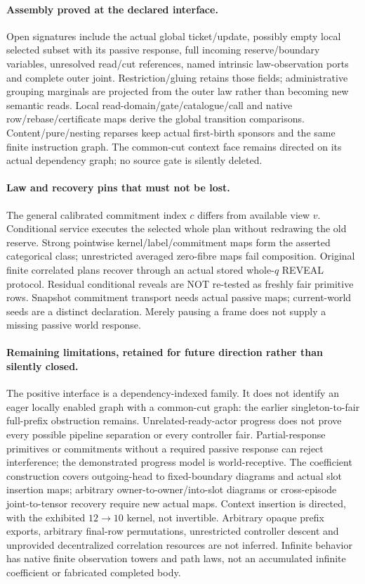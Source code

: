 \documentclass{article}\usepackage{amsmath,amssymb,url}
\begin{document}
\paragraph{Assembly proved at the declared interface.} Open signatures include the actual global ticket/update, possibly empty local selected subset with its passive response, full incoming reserve/boundary variables, unresolved read/cut references, named intrinsic law-observation ports and complete outer joint. Restriction/gluing retains those fields; administrative grouping marginals are projected from the outer law rather than becoming new semantic reads. Local read-domain/gate/catalogue/call and native row/rebase/certificate maps derive the global transition comparisons. Content/pure/nesting reparses keep actual first-birth sponsors and the same finite instruction graph. The common-cut context face remains directed on its actual dependency graph; no source gate is silently deleted.

\paragraph{Law and recovery pins that must not be lost.} The general calibrated commitment index $c$ differs from available view $v$. Conditional service executes the selected whole plan without redrawing the old reserve. Strong pointwise kernel/label/commitment maps form the asserted categorical class; unrestricted averaged zero-fibre maps fail composition. Original finite correlated plans recover through an actual stored whole-$q$ REVEAL protocol. Residual conditional reveals are NOT re-tested as freshly fair primitive rows. Snapshot commitment transport needs actual passive maps; current-world seeds are a distinct declaration. Merely pausing a frame does not supply a missing passive world response.

\paragraph{Remaining limitations, retained for future direction rather than silently closed.}
The positive interface is a dependency-indexed family. It does not identify an eager locally enabled graph with a common-cut graph: the earlier singleton-to-fair full-prefix obstruction remains. Unrelated-ready-actor progress does not prove every possible pipeline separation or every controller fair. Partial-response primitives or commitments without a required passive response can reject interference; the demonstrated progress model is world-receptive. The coefficient construction covers outgoing-head to fixed-boundary diagrams and actual slot insertion maps; arbitrary owner-to-owner/into-slot diagrams or cross-episode joint-to-tensor recovery require new actual maps. Context insertion is directed, with the exhibited $12\to10$ kernel, not invertible. Arbitrary opaque prefix exports, arbitrary final-row permutations, unrestricted controller descent and unprovided decentralized correlation resources are not inferred. Infinite behavior has native finite observation towers and path laws, not an accumulated infinite coefficient or fabricated completed body.
\end{document}
